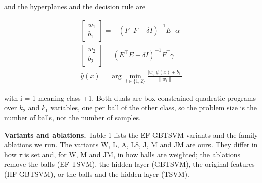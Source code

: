\documentclass[conference,a4paper]{IEEEtran}
\begin{document}
and the hyperplanes and the decision rule are

\begin{equation}
\begin{gathered}
\begin{bmatrix}w_1\\ b_1\end{bmatrix}=-(F^{\top}F+\delta I)^{-1}E^{\top}\alpha \\ \begin{bmatrix}w_2\\ b_2\end{bmatrix}=(E^{\top}E+\delta I)^{-1}F^{\top}\gamma \\ \hat y(x)=\arg\min_{i\in\{1,2\}}\frac{\lvert w_i^{\top}\psi(x)+b_i\rvert}{\lVert w_i\rVert}
\end{gathered}
\end{equation}

with i = 1 meaning class +1. Both duals are box-constrained quadratic programs over $k_{2}$ and $k_{1}$ variables, one per ball of the other class, so the problem size is the number of balls, not the number of samples.

\textbf{Variants and ablations.} Table 1 lists the EF-GBTSVM variants and the family ablations we run. The variants W, L, A, L8, J, M and JM are ours. They differ in how $\tau$ is set and, for W, M and JM, in how balls are weighted; the ablations remove the balls (EF-TSVM), the hidden layer (GBTSVM), the original features (HF-GBTSVM), or the balls and the hidden layer (TSVM).
\end{document}
